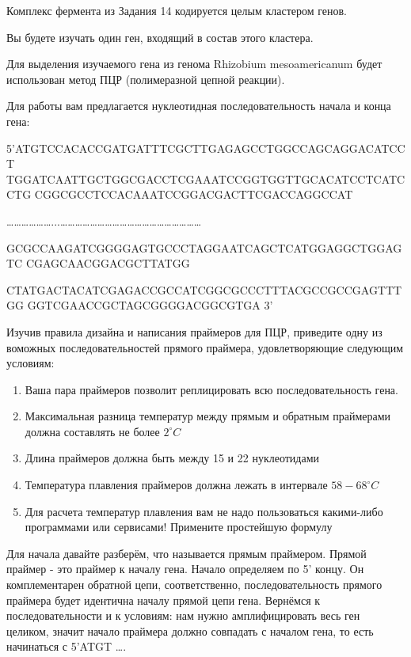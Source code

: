 
Комплекс фермента из Задания 14 кодируется целым кластером генов.

Вы будете изучать один ген, входящий в состав этого кластера.

Для выделения изучаемого гена из генома Rhizobium mesoamericanum будет использован метод ПЦР (полимеразной цепной реакции).

Для работы вам предлагается нуклеотидная последовательность начала и конца гена:

5’ATGTCCACACCGATGATTTCGCTTGAGAGCCTGGCCAGCAGGACATCCT\linebreak
TGGATCAATTGCTGGCGACCTCGAAATCCGGTGGTTGCACATCCTCATCCTG\linebreak
CGGCGCCTCCACAAATCCGGACGACTTCGACCAGGCCAT

………………...…………………………………………………

GCGCCAAGATCGGGGAGTGCCCTAGGAATCAGCTCATGGAGGCTGGAGTC\linebreak
CGAGCAACGGACGCTTATGG

CTATGACTACATCGAGACCGCCATCGGCGCCCTTTACGCCGCCGAGTTTGG\linebreak
GGTCGAACCGCTAGCGGGGACGGCGTGA 3’

Изучив правила дизайна и написания праймеров для ПЦР, приведите одну из воможных последовательностей прямого праймера, удовлетворяющие следующим условиям:

\begin{enumerate}
    \item Ваша пара праймеров позволит реплицировать всю последовательность гена.
    \item Максимальная разница температур между прямым и обратным праймерами должна составлять не более $2^{\circ}C$
    \item Длина праймеров должна быть между 15 и 22  нуклеотидами
    \item Температура плавления праймеров должна лежать в интервале $58-68^{\circ}C$
    \item Для расчета температур плавления вам не надо пользоваться какими-либо программами или сервисами! Примените простейшую формулу
\end{enumerate}

\solutionSection

Для начала давайте разберём, что называется прямым праймером. Прямой праймер - это праймер к началу гена. Начало определяем по 5’ концу. Он комплементарен обратной цепи, соответственно, последовательность прямого праймера будет идентична началу прямой цепи гена. Вернёмся к последовательности и к условиям: нам нужно амплифицировать весь ген целиком, значит начало праймера должно совпадать с началом гена, то есть начинаться с 5’ATGT \dots. 

